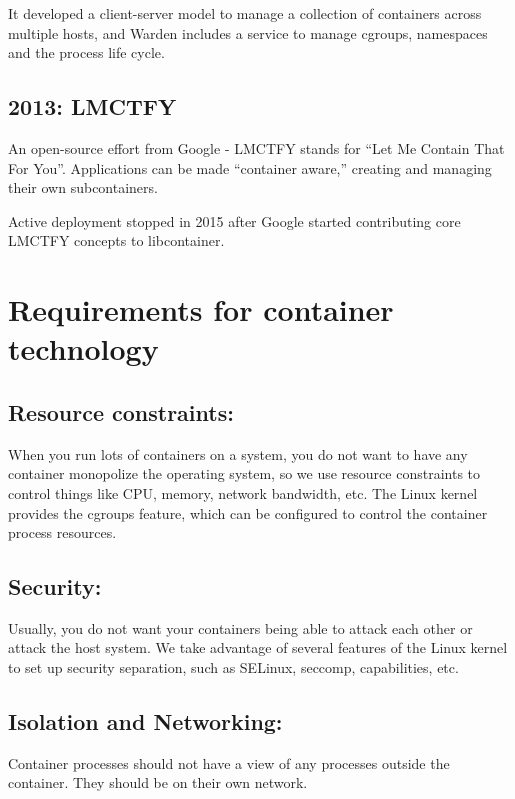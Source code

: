 It developed a client-server model to manage a collection of containers across
multiple hosts, and Warden includes a service to manage cgroups, namespaces and
the process life cycle.

\subsection{2013: LMCTFY}
\label{sec:LMCTFY}

An open-source effort from Google - LMCTFY stands for “Let Me Contain That For
You”. Applications can be made “container aware,” creating and managing their
own subcontainers.

Active deployment stopped in 2015 after Google started contributing core LMCTFY
concepts to libcontainer.




\section{Requirements for container technology}



\subsection{Resource constraints:}

When you run lots of containers on a system, you do not want to have any
container monopolize the operating system, so we use resource constraints to
control things like CPU, memory, network bandwidth, etc. The Linux kernel
provides the cgroups feature, which can be configured to control the container
process resources.

\subsection{Security: }
Usually, you do not want your containers being able to attack each other or
attack the host system. We take advantage of several features of the Linux
kernel to set up security separation, such as SELinux, seccomp, capabilities,
etc.


\subsection{Isolation and Networking:}

Container processes should not have a view of any processes outside the
container. They should be on their own network. 

